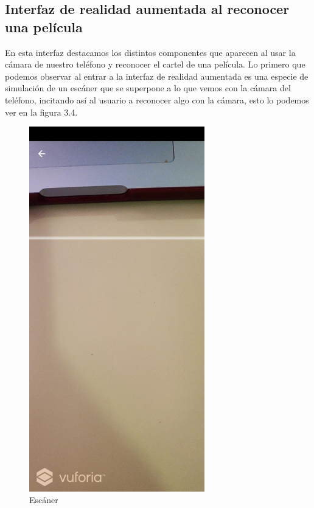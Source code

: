 \subsection{Interfaz de realidad aumentada al reconocer una película}
\label{makereference3.4.4}
En esta interfaz destacamos los distintos componentes que aparecen al usar la cámara de nuestro teléfono y reconocer el cartel de una película.
Lo primero que podemos observar al entrar a la interfaz de realidad aumentada es una especie de simulación de un escáner que se superpone a lo que vemos con la
cámara del teléfono, incitando así al usuario a reconocer algo con la cámara, esto lo podemos ver en la figura 3.4.

\begin{figure}[H]
    \centering
    \includegraphics[width=3in]{figures/escaner.jpg}
    \caption{Escáner}
\end{figure}

